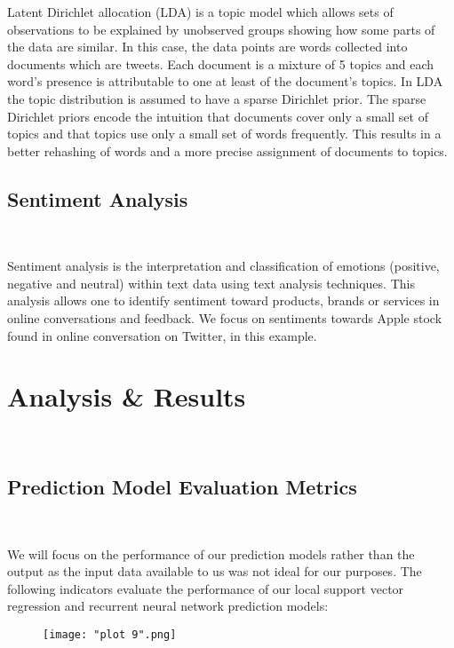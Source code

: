 \documentclass[11pt, oneside]{article}   	%
\begin{document}
Latent Dirichlet allocation (LDA) is a topic model which allows sets of observations to be explained by unobserved groups showing how some parts of the data are similar. In this case, the data points are words collected into documents which are tweets. Each document is a mixture of 5 topics and each word's presence is attributable to one at least of the document's topics. In LDA the topic distribution is assumed to have a sparse Dirichlet prior. The sparse Dirichlet priors encode the intuition that documents cover only a small set of topics and that topics use only a small set of words frequently. This results in a better rehashing of words and a more precise assignment of documents to topics.

\subsection{Sentiment Analysis} \

Sentiment analysis is the interpretation and classification of emotions (positive, negative and neutral) within text data using text analysis techniques. This analysis allows one to identify sentiment toward products, brands or services in online conversations and feedback. We focus on sentiments towards Apple stock found in online conversation on Twitter, in this example.
\newpage

\section{Analysis \& Results}\

\subsection{Prediction Model Evaluation Metrics}\

 We will focus on the performance of our prediction models rather than the output as the input data available to us was not ideal for our purposes. The following indicators evaluate the performance of our local support vector regression and recurrent neural network prediction models:\\

\begin{figure}[!h] %
   \centering
   \texttt{[image: "plot 9".png]} 
\end{figure}
\end{document}

